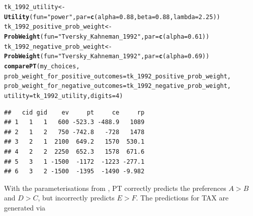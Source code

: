 \documentclass{article}\usepackage[]{graphicx}\usepackage[]{color}
\makeatletter
\newcommand{\hlnum}[1]{\textcolor[rgb]{0.686,0.059,0.569}{#1}}%
\newcommand{\hlstr}[1]{\textcolor[rgb]{0.192,0.494,0.8}{#1}}%
\newcommand{\hlstd}[1]{\textcolor[rgb]{0.345,0.345,0.345}{#1}}%
\newcommand{\hlkwb}[1]{\textcolor[rgb]{0.69,0.353,0.396}{#1}}%
\newcommand{\hlkwc}[1]{\textcolor[rgb]{0.333,0.667,0.333}{#1}}%
\newcommand{\hlkwd}[1]{\textcolor[rgb]{0.737,0.353,0.396}{\textbf{#1}}}%
\newenvironment{kframe}{%
 \def\at@end@of@kframe{}%
 \ifinner\ifhmode%
  \def\at@end@of@kframe{\end{minipage}}%
  \begin{minipage}{\columnwidth}%
 \fi\fi%
 \def\FrameCommand##1{\hskip\@totalleftmargin \hskip-\fboxsep
 \colorbox{shadecolor}{##1}\hskip-\fboxsep
     \hskip-\linewidth \hskip-\@totalleftmargin \hskip\columnwidth}%
 \MakeFramed {\advance\hsize-\width
   \@totalleftmargin\z@ \linewidth\hsize
   \@setminipage}}%
 {\par\unskip\endMakeFramed%
 \at@end@of@kframe}
\newenvironment{knitrout}{}{} %
\makeatother
\begin{document}
\begin{knitrout}
\color{fgcolor}\begin{kframe}
\begin{alltt}
\hlstd{tk_1992_utility} \hlkwb{<-} \hlkwd{Utility}\hlstd{(}\hlkwc{fun}\hlstd{=}\hlstr{"power"}\hlstd{,} \hlkwc{par}\hlstd{=}\hlkwd{c}\hlstd{(}\hlkwc{alpha}\hlstd{=}\hlnum{0.88}\hlstd{,} \hlkwc{beta}\hlstd{=}\hlnum{0.88}\hlstd{,} \hlkwc{lambda}\hlstd{=}\hlnum{2.25}\hlstd{))}
\hlstd{tk_1992_positive_prob_weight} \hlkwb{<-} \hlkwd{ProbWeight}\hlstd{(}\hlkwc{fun}\hlstd{=}\hlstr{"Tversky_Kahneman_1992"}\hlstd{,} \hlkwc{par}\hlstd{=}\hlkwd{c}\hlstd{(}\hlkwc{alpha}\hlstd{=}\hlnum{0.61}\hlstd{))}
\hlstd{tk_1992_negative_prob_weight} \hlkwb{<-} \hlkwd{ProbWeight}\hlstd{(}\hlkwc{fun}\hlstd{=}\hlstr{"Tversky_Kahneman_1992"}\hlstd{,} \hlkwc{par}\hlstd{=}\hlkwd{c}\hlstd{(}\hlkwc{alpha}\hlstd{=}\hlnum{0.69}\hlstd{))}
\hlkwd{comparePT}\hlstd{(my_choices,}
        \hlkwc{prob_weight_for_positive_outcomes}\hlstd{=tk_1992_positive_prob_weight,}
        \hlkwc{prob_weight_for_negative_outcomes}\hlstd{=tk_1992_negative_prob_weight,}
        \hlkwc{utility}\hlstd{=tk_1992_utility,} \hlkwc{digits}\hlstd{=}\hlnum{4}\hlstd{)}
\end{alltt}
\begin{verbatim}
##   cid gid    ev     pt     ce     rp
## 1   1   1   600 -523.3 -488.9   1089
## 2   1   2   750 -742.8   -728   1478
## 3   2   1  2100  649.2   1570  530.1
## 4   2   2  2250  652.3   1578  671.6
## 5   3   1 -1500  -1172  -1223 -277.1
## 6   3   2 -1500  -1395  -1490 -9.982
\end{verbatim}
\end{kframe}
\end{knitrout}


With the parameterisations from \cite{Tversky_Kahneman_1992}, PT correctly predicts the preferences $A > B$ and $D > C$, but incorrectly predicts $E > F$.
The predictions for TAX are generated via
\end{document}
